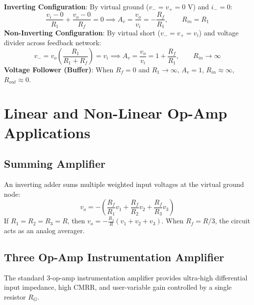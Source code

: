 \documentclass[12pt,a4paper]{article}
\begin{document}
\begin{tcolorbox}[formulabox, title={Inverting \& Non-Inverting Gain Derivations}]
\textbf{Inverting Configuration}:
By virtual ground ($v_- = v_+ = 0\text{ V}$) and $i_- = 0$:
\begin{equation}
  \frac{v_i - 0}{R_1} + \frac{v_o - 0}{R_f} = 0 \implies A_v = \frac{v_o}{v_i} = -\frac{R_f}{R_1}, \qquad R_{in} = R_1
\end{equation}
\textbf{Non-Inverting Configuration}:
By virtual short ($v_- = v_+ = v_i$) and voltage divider across feedback network:
\begin{equation}
  v_- = v_o \left(\frac{R_1}{R_1 + R_f}\right) = v_i \implies A_v = \frac{v_o}{v_i} = 1 + \frac{R_f}{R_1}, \qquad R_{in} \to \infty
\end{equation}
\textbf{Voltage Follower (Buffer)}: When $R_f = 0$ and $R_1 \to \infty$, $A_v = 1$, $R_{in} \approx \infty$, $R_{out} \approx 0$.
\end{tcolorbox}

\section{Linear and Non-Linear Op-Amp Applications}

\subsection{Summing Amplifier}
An inverting adder sums multiple weighted input voltages at the virtual ground node:
\begin{equation}
  v_o = -\left(\frac{R_f}{R_1} v_1 + \frac{R_f}{R_2} v_2 + \frac{R_f}{R_3} v_3\right)
\end{equation}
If $R_1 = R_2 = R_3 = R$, then $v_o = -\frac{R_f}{R}(v_1 + v_2 + v_3)$. When $R_f = R/3$, the circuit acts as an analog averager.

\subsection{Three Op-Amp Instrumentation Amplifier}
\begin{tcolorbox}[defbox, title={Three Op-Amp Instrumentation Amplifier}]
The standard 3-op-amp instrumentation amplifier provides ultra-high differential input impedance, high CMRR, and user-variable gain controlled by a single resistor $R_G$.
\end{tcolorbox}
\end{document}
